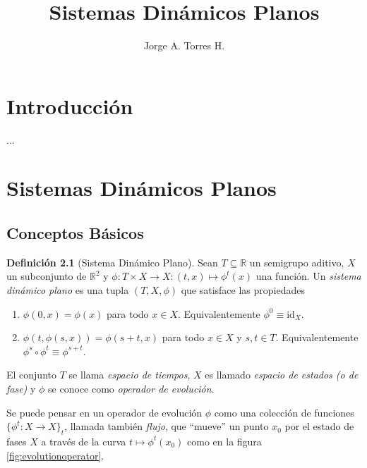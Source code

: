 \documentclass[11pt]{book}
\theoremstyle{definition}
\newtheorem{definition}{Definición}
\numberwithin{definition}{section}
\theoremstyle{theorem}
\numberwithin{theorem}{section}
\numberwithin{lemma}{section}
\numberwithin{corollary}{section}
\theoremstyle{plain}
\numberwithin{example}{section}
\newcommand{\R}{{\ensuremath{\mathbb{R}}}}
\begin{document}
\title{Sistemas Dinámicos Planos}
\author{Jorge A. Torres H.}
\maketitle

\tableofcontents

\chapter{Introducción}
\label{cap:introduccion}

...

\chapter{Sistemas Dinámicos Planos}
\label{cap:sistemasplanosautonomos}

\section{Conceptos Básicos}

\begin{definition}[Sistema Dinámico Plano] \label{def:dynamicalsystem}
Sean $T \subseteq \R$ un semigrupo aditivo, $X$ un subconjunto de $\R^2$ y $\phi: T \times X \to X: (t,x) \mapsto \phi^t(x)$ una función. Un \emph{sistema dinámico plano} es una tupla $(T, X, \phi)$ que satisface las propiedades

\begin{enumerate}[(1)]
    \item $\phi \left( 0, x \right) = \phi \left( x \right)$ para todo $x \in
    X$. Equivalentemente $\phi^0 \equiv \text{id}_X$.
    
    \item $\phi \left( t, \phi \left( s, x \right) \right) = \phi \left(
    s + t, x \right)$ para todo $x \in X$ y $s, t \in T$. Equivalentemente $\phi^{s} \circ \phi^{t} \equiv \phi^{s + t}$.
\end{enumerate}

El conjunto $T$ se llama \emph{espacio de tiempos}, $X$ es llamado {\emph{espacio de estados (o de fase)}} y $\phi$ se conoce como {\emph{operador de evoluci\'on}}.
\end{definition}

Se puede pensar en un operador de evolución $\phi$ como una colección de funciones $\{ \phi^t: X \to X \}_t$, llamada también \emph{flujo}, que ``mueve'' un punto $x_0$ por el estado de fases $X$ a través de la curva $t \mapsto \phi^t(x_0)$ como en la figura \ref{fig:evolutionoperator}.
\end{document}
